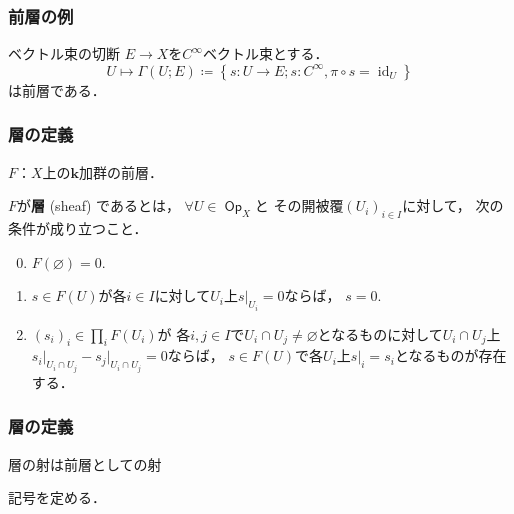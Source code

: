 \documentclass[dvipdfmx,10pt,aspectratio=169,leqno]{beamer}%
\newcommand{\kk}{\mathbf{k}}
\newcommand{\Ab}{{\mathsf{Ab}}}
\newcommand{\Mod}{\mathop{\mathrm{Mod}}\nolimits}
\numberwithin{equation}{subsection}
\newcommand{\Op}{\mathop{\textsf{Op}}\nolimits}
\newcommand{\id}{\mathop{\mathrm{id}}\nolimits}
\newcommand{\Sh}{\mathrm{Sh}}
\newcommand{\PSh}{\mathrm{PSh}}
\theoremstyle{mystyle}
\begin{document}
\begin{frame}
    \frametitle{前層の例}
    \begin{exampleblock}{ベクトル束の切断}
        \(E\to X\)を\(C^{\infty}\)ベクトル束とする．
        \[
            U\mapsto \Gamma(U;E)\coloneqq
            \left\{s\colon U\to E;s\colon C^{\infty},\pi\circ s=\id_U\right\}
        \]は前層である．
    \end{exampleblock}
\end{frame}

\begin{frame}
    \frametitle{層の定義}
    \begin{definition}[層]\label{def:sheaf}
        \(F\)：\(X\)上の\(\kk\)加群の前層．
        
        \(F\)が\textbf{層} (sheaf) であるとは，
        \(\forall U\in\Op_{X}\)と
        その開被覆\(\left(U_i\right)_{i\in I}\)に対して，
        次の条件が成り立つこと．
        \begin{enumerate}[(S1)]
            \setcounter{enumi}{-1}
            \item \(F(\varnothing)=0\).
            \item \(s\in F(U)\)が各\(i\in I\)に対して\(U_i\)上\(s\rvert_{U_{i}}=0\)ならば，
            \(s=0\).\label{sheaf-cond1}
            \item \(\left(s_i\right)_i\in\prod_{i}F(U_i)\)が
            各\(i,j\in I\)で\(U_i\cap U_j\ne\varnothing\)となるものに対して\(U_i\cap U_j\)上\(s_i\rvert_{U_i\cap U_j}-s_j\rvert_{U_i\cap U_j}=0\)ならば，
            \(s\in F(U)\)で各\(U_i\)上\(s\rvert_i=s_i\)となるものが存在する．\label{sheaf-cond2}
        \end{enumerate}
    \end{definition}    
\end{frame}

\begin{frame}
    \frametitle{層の定義}
    層の射は前層としての射

    \bigskip
    記号を定める．
\end{frame}
\end{document}
